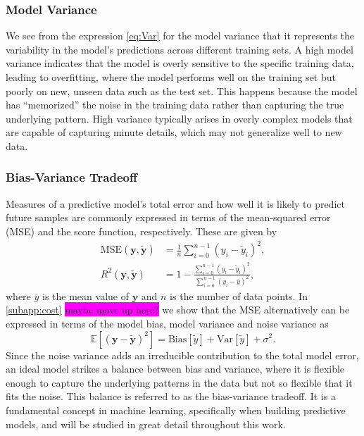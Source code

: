 \documentclass[aps,pra,english,notitlepage,reprint,nofootinbib]{revtex4-1}  %
\begin{document}
\subsubsection{Model Variance}
We see from the expression \eqref{eq:Var} for the model variance that it represents the variability in the model's predictions across different training sets. A high model variance indicates that the model is overly sensitive to the specific training data, leading to overfitting, where the model performs well on the training set but poorly on new, unseen data such as the test set. This happens because the model has ``memorized'' the noise in the training data rather than capturing the true underlying pattern. High variance typically arises in overly complex models that are capable of capturing minute details, which may not generalize well to new data.

\subsubsection{Bias-Variance Tradeoff}
Measures of a predictive model's total error and how well it is likely to predict future samples are commonly expressed in terms of the mean-squared error (MSE) and the score function, respectively. These are given by
\begin{align}
  \text{MSE}(\mathbf{y},\mathbf{\tilde{y}}) &= \frac{1}{n}\sum_{i=0}^{n-1}\left(y_i-\tilde{y}_i\right)^2, \label{eq:MSE}
  \\
  R^2(\mathbf{y},\mathbf{\tilde{y}}) &= 1 -\frac{\sum_{i=0}^{n-1}\left(y_i-\tilde{y}_i\right)^2}{\sum_{i=0}^{n-1}\left(y_i-\overline{y}\right)^2}, \label{eq:R2}
\end{align}
where $\overline{y}$ is the mean value of $\mathbf{y}$ and $n$ is the number of data points. In \cref{subapp:cost} \colorbox{magenta}{maybe move up here?} we show that the MSE alternatively can be expressed in terms of the model bias, model variance and noise variance as 
\begin{equation}
  \mathbb{E}\left[(\mathbf{y}-\mathbf{\tilde{y}})^2 \right] = \text{Bias}[\tilde{y}] + \text{Var}[\tilde{y}] + \sigma^2. \label{eq:model error}
\end{equation}
Since the noise variance adds an irreducible contribution to the total model error, an ideal model strikes a balance between bias and variance, where it is flexible enough to capture the underlying patterns in the data but not so flexible that it fits the noise. This balance is referred to as the bias-variance tradeoff. It is a fundamental concept in machine learning, specifically when building predictive models, and will be studied in great detail throughout this work.
\end{document}
